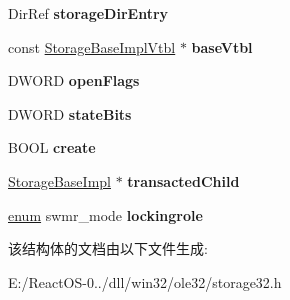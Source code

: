 \begin{DoxyCompactItemize}
Dir\+Ref {\bfseries storage\+Dir\+Entry}
\item 
\mbox{\label{struct_storage_base_impl_ad32aa83d89be32c98682857156c5b8c9}} 
const \hyperlink{struct_storage_base_impl_vtbl}{Storage\+Base\+Impl\+Vtbl} $\ast$ {\bfseries base\+Vtbl}
\item 
\mbox{\label{struct_storage_base_impl_a329c697cf314366a92c46c8c7531cdad}} 
D\+W\+O\+RD {\bfseries open\+Flags}
\item 
\mbox{\label{struct_storage_base_impl_a0257cd5eb161de08c628dfe29f8f8ed1}} 
D\+W\+O\+RD {\bfseries state\+Bits}
\item 
\mbox{\label{struct_storage_base_impl_aa4c22c15c6c861ffe352e5a8dc35cb5e}} 
B\+O\+OL {\bfseries create}
\item 
\mbox{\label{struct_storage_base_impl_ac80970713fbc1cbd42d099400fff88d6}} 
\hyperlink{struct_storage_base_impl}{Storage\+Base\+Impl} $\ast$ {\bfseries transacted\+Child}
\item 
\mbox{\label{struct_storage_base_impl_a00fdbd3889df0ef29243345e2bade95c}} 
\hyperlink{interfaceenum}{enum} swmr\+\_\+mode {\bfseries lockingrole}
\end{DoxyCompactItemize}


该结构体的文档由以下文件生成\+:\begin{DoxyCompactItemize}
\item 
E\+:/\+React\+O\+S-\/0../dll/win32/ole32/storage32.\+h\end{DoxyCompactItemize}
